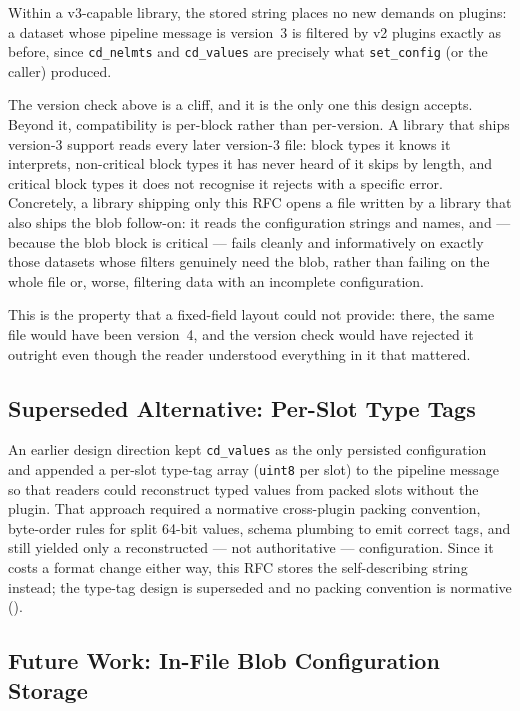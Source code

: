 \documentclass[../RFC-HDFG-2026-001.tex]{subfiles}
\begin{document}
Within a v3-capable library, the stored string places no new demands on
plugins: a dataset whose pipeline message is version~3 is filtered by v2
plugins exactly as before, since \texttt{cd\_nelmts} and
\texttt{cd\_values} are precisely what \texttt{set\_config} (or the
caller) produced.


The version check above is a cliff, and it is the only one this design
accepts.  Beyond it, compatibility is per-block rather than per-version.
A library that ships version-3 support reads every later version-3 file:
block types it knows it interprets, non-critical block types it has never
heard of it skips by length, and critical block types it does not
recognise it rejects with a specific error.  Concretely, a library
shipping only this RFC opens a file written by a library that also ships
the blob follow-on: it reads the configuration strings and names, and ---
because the blob block is critical --- fails cleanly and informatively on
exactly those datasets whose filters genuinely need the blob, rather than
failing on the whole file or, worse, filtering data with an incomplete
configuration.

This is the property that a fixed-field layout could not provide: there,
the same file would have been version~4, and the version check would have
rejected it outright even though the reader understood everything in it
that mattered.

\subsection{Superseded Alternative: Per-Slot Type Tags}
\label{sec:type-tags-superseded}

An earlier design direction kept \texttt{cd\_values} as the only
persisted configuration and appended a per-slot type-tag array
(\texttt{uint8} per slot) to the pipeline message so that readers could
reconstruct typed values from packed slots without the plugin.  That
approach required a normative cross-plugin packing convention, byte-order
rules for split 64-bit values, schema plumbing to emit correct tags, and
still yielded only a reconstructed --- not authoritative ---
configuration.  Since it costs a format change either way, this RFC
stores the self-describing string instead; the type-tag design is
superseded and no packing convention is normative
().

\subsection{Future Work: In-File Blob Configuration Storage}
\label{sec:blob-future}
\end{document}
